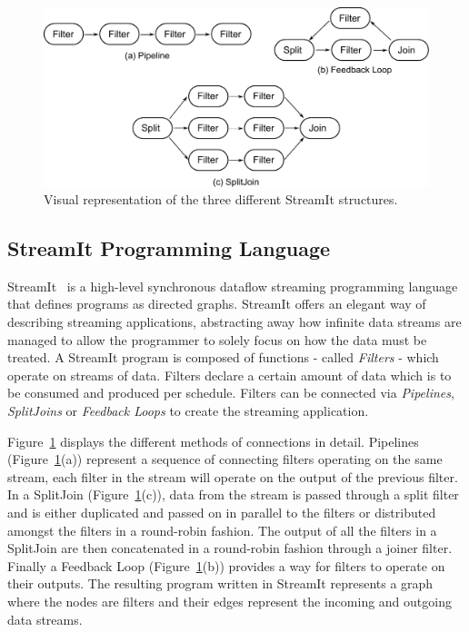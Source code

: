 \begin{figure}
    \centering
    \includegraphics[width=1\textwidth]{streamit-paper/graphics/streamit_types.pdf}
    \caption{Visual representation of the three different StreamIt structures.}
    \label{fig:streamittypes}
\end{figure}

\subsection{StreamIt Programming Language}
StreamIt~\cite{theis2002streamit} is a high-level synchronous dataflow streaming programming language that defines programs as directed graphs.
StreamIt offers an elegant way of describing streaming applications, abstracting away how infinite data streams are managed to allow the programmer to solely focus on how the data must be treated.
A StreamIt program is composed of functions - called \textit{Filters} - which operate on streams of data.
Filters declare a certain amount of data which is to be consumed and produced per schedule.
Filters can be connected via \textit{Pipelines}, \textit{SplitJoins} or \textit{Feedback Loops} to create the streaming application.

Figure~\ref{fig:streamittypes} displays the different methods of connections in detail.
Pipelines (Figure~\ref{fig:streamittypes}(a)) represent a sequence of connecting filters operating on the same stream, each filter in the stream will operate on the output of the previous filter.
In a SplitJoin (Figure~\ref{fig:streamittypes}(c)), data from the stream is passed through a split filter and is either duplicated and passed on in parallel to the filters or distributed amongst the filters in a round-robin fashion.
The output of all the filters in a SplitJoin are then concatenated in a round-robin fashion through a joiner filter.
Finally a Feedback Loop (Figure~\ref{fig:streamittypes}(b)) provides a way for filters to operate on their outputs.
The resulting program written in StreamIt represents a graph where the nodes are filters and their edges represent the incoming and outgoing data streams.

